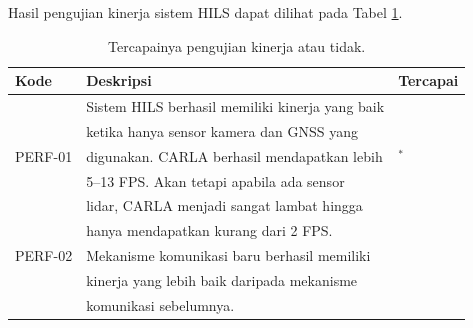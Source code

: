 Hasil pengujian kinerja sistem HILS dapat dilihat pada Tabel \ref{chapter-4-tbl-perf-criteria-result}.
\begin{table}[!htbp]
	\begin{center}
		\begin{tabular}{|l|l|l|}
			\hline
			\textbf{Kode} & \textbf{Deskripsi}                              & \textbf{Tercapai} \\
			\hline
			              & Sistem HILS berhasil memiliki kinerja yang baik &                   \\
			              & ketika hanya sensor kamera dan GNSS yang        &                   \\
			PERF-01       & digunakan. CARLA berhasil mendapatkan lebih     & \checkmark$^*$    \\
			              & 5--13 FPS. Akan tetapi apabila ada sensor       &                   \\
			              & lidar, CARLA menjadi sangat lambat hingga       &                   \\
			              & hanya mendapatkan kurang dari 2 FPS.            &                   \\
			\hline
			PERF-02       & Mekanisme komunikasi baru berhasil memiliki     &                   \\
			              & kinerja yang lebih baik daripada mekanisme      & \checkmark        \\
			              & komunikasi sebelumnya.                          &                   \\
			\hline
		\end{tabular}
	\end{center}

	\caption{Tercapainya pengujian kinerja atau tidak.}
	\label{chapter-4-tbl-perf-criteria-result}
\end{table}

